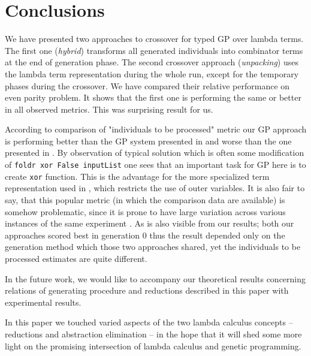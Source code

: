 \documentclass{sig-alternate}
\newcommand{\red}[1]{{\color{red} #1}}
\begin{document}
\section{Conclusions}
\label{conclusions}

We have presented two approaches to crossover for typed GP over lambda terms. The first one (\textit{hybrid}) transforms all generated individuals into combinator terms at the end of generation phase. The second crossover approach (\textit{unpacking}) uses the lambda term representation during the whole run, except for the temporary phases during the crossover. We have compared their relative performance on even parity problem. It shows that the first one is performing the same or better in all observed metrics. This was surprising result for us.

According to comparison of "individuals to be processed" metric our GP approach is performing better than the GP system presented in \cite{kes} and worse than the one presented in \cite{yu01}. By observation of typical solution which is often some modification of \texttt{foldr xor False inputList} one sees that an important task for GP here is to create \texttt{xor} function. This is the advantage for the more specialized term representation used in \cite{yu01}, which 
restricts the use of outer variables. 
It is also fair to say, that this popular metric (in which the comparison data are available) is somehow problematic, since it is prone to have large variation across various instances of the same experiment \cite{luke2002perfect}. As is also visible from our results; both our approaches scored best in generation 0 thus the result depended only on the generation method which those two approaches shared, yet the individuals to be processed estimates are quite different.

In the future work, we would like to accompany our theoretical results concerning relations of generating procedure and reductions described in this paper with experimental results.

In this paper we touched varied aspects of the two lambda calculus concepts -- reductions and abstraction elimination -- in the hope that it will shed some more
light on the promising intersection of lambda calculus and genetic programming.



\end{document}
